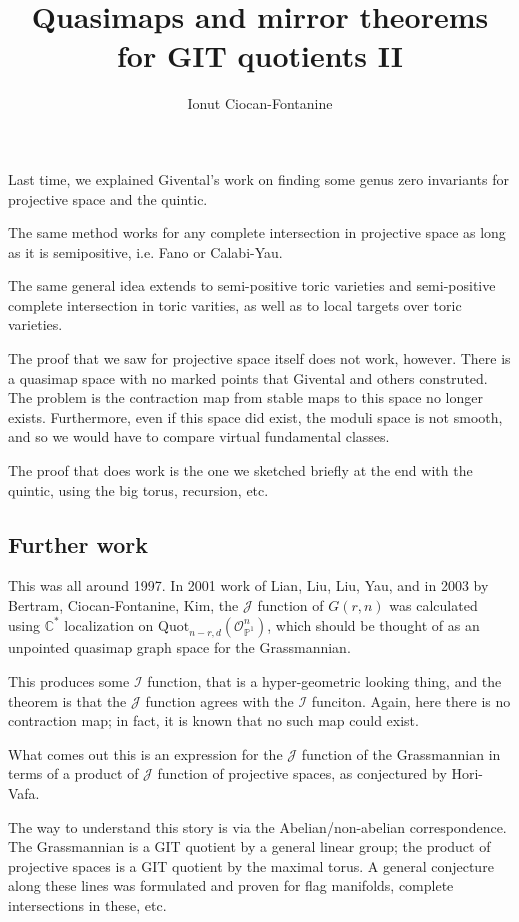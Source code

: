 \documentclass{amsart}
\title{Quasimaps and mirror theorems for GIT quotients II}
\author{Ionut Ciocan-Fontanine}
\theoremstyle{definition}
\newcommand{\OO}{\mathcal{O}}
\newcommand{\proj}{\mathbb{P}}
\newcommand{\J}{\mathcal{J}}
\newcommand{\C}{\mathbb{C}}
\newcommand{\Quot}{\text{Quot}}
\begin{document}
\maketitle
Last time, we explained Givental's work on finding some genus zero invariants for projective space and the quintic.

The same method works for any complete intersection in projective space as long as it is semipositive, i.e. Fano or Calabi-Yau.  

The same general idea extends to semi-positive toric varieties and semi-positive complete intersection in toric varities, as well as to local targets over toric varieties.

The proof that we saw for projective space itself does not work, however.
There is a quasimap space with no marked points that Givental and others construted.  The problem is the contraction map from stable maps to this space no longer exists.  
Furthermore, even if this space did exist, the moduli space is not smooth, and so we would have to compare virtual fundamental classes.

The proof that does work is the one we sketched briefly at the end with the quintic, using the big torus, recursion, etc.

\subsection{Further work}
This was all around 1997.  In 2001 work of Lian, Liu, Liu, Yau, and in 2003 by Bertram, Ciocan-Fontanine, Kim, the $\J$ function of $G(r,n)$ was calculated using $\C^*$ localization on $\Quot_{n-r,d}(\OO_{\proj^1}^n)$, which should be thought of as an unpointed quasimap graph space for the Grassmannian.

This produces some $\mathcal{I}$ function, that is a hyper-geometric looking thing, and the theorem is that the $\J$ function agrees with the $\mathcal{I}$ funciton.  Again, here there is no contraction map; in fact, it is known that no such map could exist.

What comes out this is an expression for the $\J$ function of the Grassmannian in terms of a product of $\J$ function of projective spaces, as conjectured by Hori-Vafa.

The way to understand this story is via the Abelian/non-abelian correspondence.  The Grassmannian is a GIT quotient by a general linear group; the product of projective spaces is a GIT quotient by the maximal torus.  A general conjecture along these lines was formulated and proven for flag manifolds, complete intersections in these, etc.
\end{document}
